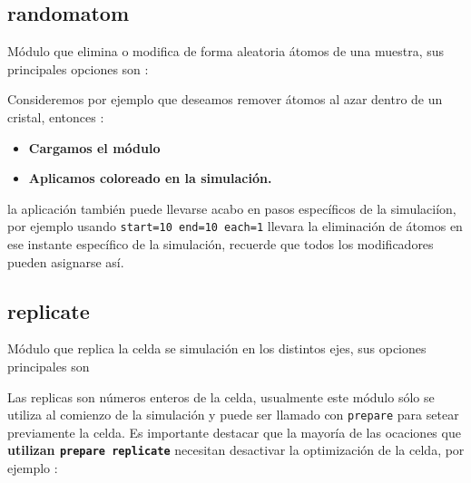 \subsection{randomatom}
M\'odulo que elimina o modifica de forma aleatoria \'atomos de una muestra, sus
principales opciones son : 


Consideremos por ejemplo que deseamos remover \'atomos al azar dentro de un
cristal, entonces :

\begin{itemize}
 \item \textbf{Cargamos el m\'odulo}
 \item \textbf{Aplicamos coloreado en la simulaci\'on.}
\end{itemize}

la aplicaci\'on tambi\'en puede llevarse acabo en pasos espec\'ificos de la
simulaci\'ion, por ejemplo usando \texttt{start=10 end=10 each=1} llevara la
eliminaci\'on de \'atomos en ese instante espec\'ifico de la simulaci\'on,
recuerde que todos los modificadores pueden asignarse as\'i.

\subsection{replicate}
M\'odulo que replica la celda se simulaci\'on en los distintos ejes, sus
opciones principales son

Las replicas son n\'umeros enteros de la celda, usualmente este m\'odulo s\'olo
se utiliza al comienzo de la simulaci\'on y puede ser llamado con \verb|prepare|
para setear previamente la celda. Es importante destacar que la mayor\'ia de las
ocaciones que \textbf{utilizan \texttt{prepare replicate}} necesitan desactivar
la optimizaci\'on de la celda, por ejemplo :

